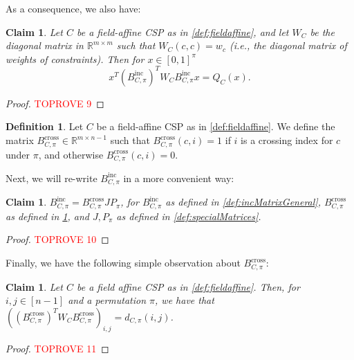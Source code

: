 \documentclass[11pt]{article}
\newtheorem{claim}[theorem]{Claim}
\theoremstyle{definition}
\newtheorem{definition}{Definition}[section]
\newcommand{\R}{\mathbb{R}}
\begin{document}
As a consequence, we also have:

\begin{claim}\label{clm:quadraticEquivalenceGeneral}
	Let $C$ be a field-affine CSP as in \cref{def:fieldaffine}, and let $W_C$ be the diagonal matrix in $\R^{m \times m}$ such that $W_C(c, c) = w_c$ (i.e., the diagonal matrix of weights of constraints). Then for $x \in [0,1]^{\pi}$
	\[
	x^T (B^{\text{inc}}_{C, \pi})^T W_C B^{\text{inc}}_{C, \pi} x = Q_C(x).
	\]
\end{claim}

\begin{proof}\textcolor{red}{TOPROVE 9}\end{proof}


\begin{definition}\label{def:crossMatrixfield}
    Let $C$ be a field-affine CSP as in \cref{def:fieldaffine}. We define the matrix $B^{\text{cross}}_{C, \pi} \in \R^{m \times n-1}$ such that $B^{\text{cross}}_{C, \pi}(c, i) = 1$ if $i$ is a crossing index for $c$ under $\pi$, and otherwise $B^{\text{cross}}_{C, \pi}(c, i) = 0$.
\end{definition}

Next, we will re-write $B^{\text{inc}}_{C, \pi}$ in a more convenient way:

\begin{claim}\label{clm:convenientRepfield}
	$B^{\text{inc}}_{C, \pi} = B^{\text{cross}}_{C, \pi} J P_{\pi}$, for $B^{\text{inc}}_{C, \pi}$ as defined in \cref{def:incMatrixGeneral}, $B^{\text{cross}}_{C, \pi}$ as defined in \cref{def:crossMatrixfield}, and $J, P_{\pi}$ as defined in \cref{def:specialMatrices}.
\end{claim}

\begin{proof}\textcolor{red}{TOPROVE 10}\end{proof}

Finally, we have the following simple observation about $B^{\text{cross}}_{C, \pi}$:

\begin{claim}\label{clm:crossingNumberCrossingMatrixGeneral}
	Let $C$ be a field affine CSP as in  \cref{def:fieldaffine}. Then, for $i, j \in [n-1]$ and a permutation $\pi$, we have that $((B^{\text{cross}}_{C, \pi})^T W_C B^{\text{cross}}_{C, \pi})_{i,j} = d_{C, \pi}(i,j)$.
\end{claim}

\begin{proof}\textcolor{red}{TOPROVE 11}\end{proof}
\end{document}
